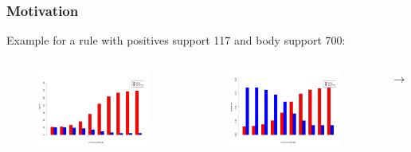 \documentclass{beamer}
\begin{document}
\begin{frame}
\frametitle{Motivation}
 Example for a rule with positives support 117 and body support 700:
\begin{columns}[c]
    \begin{figure}
    \includegraphics[height=0.3\textheight]{./Figures/supportDistribution}
    \end{figure}
    \begin{figure}
    \includegraphics[height=0.3\textheight]{./Figures/probabilityDistribution}
    \end{figure}
      $\rightarrow$

\end{columns}
\end{frame}
\end{document}
